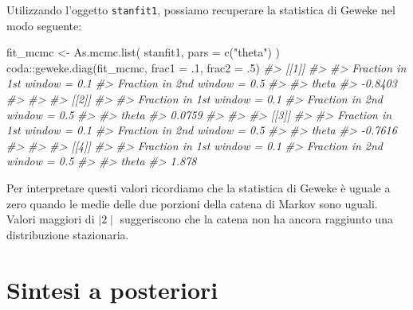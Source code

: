 \documentclass[
  11pt,
  italian,
  a4paper,
  extrafontsizes,onecolumn,openright
  ]{memoir}
\newenvironment{Shaded}{\begin{snugshade}}{\end{snugshade}}
\newcommand{\AttributeTok}[1]{\textcolor[rgb]{0.77,0.63,0.00}{#1}}
\newcommand{\CommentTok}[1]{\textcolor[rgb]{0.56,0.35,0.01}{\textit{#1}}}
\newcommand{\DecValTok}[1]{\textcolor[rgb]{0.00,0.00,0.81}{#1}}
\newcommand{\FunctionTok}[1]{\textcolor[rgb]{0.00,0.00,0.00}{#1}}
\newcommand{\NormalTok}[1]{#1}
\newcommand{\OtherTok}[1]{\textcolor[rgb]{0.56,0.35,0.01}{#1}}
\newcommand{\SpecialCharTok}[1]{\textcolor[rgb]{0.00,0.00,0.00}{#1}}
\newcommand{\StringTok}[1]{\textcolor[rgb]{0.31,0.60,0.02}{#1}}
\begin{document}
Utilizzando l'oggetto \texttt{stanfit1}, possiamo recuperare la statistica di Geweke nel modo seguente:

\begin{Shaded}
\begin{Highlighting}[]
\NormalTok{fit\_mcmc }\OtherTok{\textless{}{-}} \FunctionTok{As.mcmc.list}\NormalTok{(}
\NormalTok{  stanfit1,}
  \AttributeTok{pars =} \FunctionTok{c}\NormalTok{(}\StringTok{"theta"}\NormalTok{)}
\NormalTok{)}
\NormalTok{coda}\SpecialCharTok{::}\FunctionTok{geweke.diag}\NormalTok{(fit\_mcmc, }\AttributeTok{frac1 =}\NormalTok{ .}\DecValTok{1}\NormalTok{, }\AttributeTok{frac2 =}\NormalTok{ .}\DecValTok{5}\NormalTok{)}
\CommentTok{\#\textgreater{} [[1]]}
\CommentTok{\#\textgreater{} }
\CommentTok{\#\textgreater{} Fraction in 1st window = 0.1}
\CommentTok{\#\textgreater{} Fraction in 2nd window = 0.5 }
\CommentTok{\#\textgreater{} }
\CommentTok{\#\textgreater{}   theta }
\CommentTok{\#\textgreater{} {-}0.8403 }
\CommentTok{\#\textgreater{} }
\CommentTok{\#\textgreater{} }
\CommentTok{\#\textgreater{} [[2]]}
\CommentTok{\#\textgreater{} }
\CommentTok{\#\textgreater{} Fraction in 1st window = 0.1}
\CommentTok{\#\textgreater{} Fraction in 2nd window = 0.5 }
\CommentTok{\#\textgreater{} }
\CommentTok{\#\textgreater{}  theta }
\CommentTok{\#\textgreater{} 0.0759 }
\CommentTok{\#\textgreater{} }
\CommentTok{\#\textgreater{} }
\CommentTok{\#\textgreater{} [[3]]}
\CommentTok{\#\textgreater{} }
\CommentTok{\#\textgreater{} Fraction in 1st window = 0.1}
\CommentTok{\#\textgreater{} Fraction in 2nd window = 0.5 }
\CommentTok{\#\textgreater{} }
\CommentTok{\#\textgreater{}   theta }
\CommentTok{\#\textgreater{} {-}0.7616 }
\CommentTok{\#\textgreater{} }
\CommentTok{\#\textgreater{} }
\CommentTok{\#\textgreater{} [[4]]}
\CommentTok{\#\textgreater{} }
\CommentTok{\#\textgreater{} Fraction in 1st window = 0.1}
\CommentTok{\#\textgreater{} Fraction in 2nd window = 0.5 }
\CommentTok{\#\textgreater{} }
\CommentTok{\#\textgreater{} theta }
\CommentTok{\#\textgreater{} 1.878}
\end{Highlighting}
\end{Shaded}

\noindent
Per interpretare questi valori ricordiamo che la statistica di Geweke è uguale a zero quando le medie delle due porzioni della catena di Markov sono uguali. Valori maggiori di \(\mid 2 \mid\) suggeriscono che la catena non ha ancora raggiunto una distribuzione stazionaria.

\hypertarget{chapter-sintesi-distr-post}{%
\chapter{Sintesi a posteriori}\label{chapter-sintesi-distr-post}}
\end{document}

